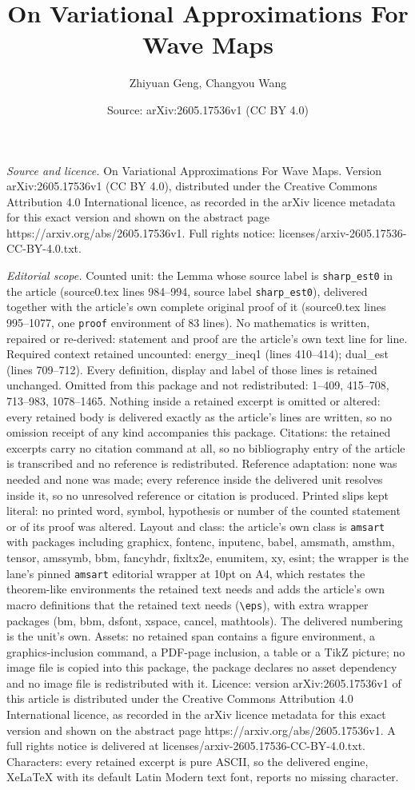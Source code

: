 \documentclass[10pt,a4paper]{amsart}
\title[On Variational Approximations For Wave Maps]{On Variational Approximations For Wave Maps}
\author{Zhiyuan Geng, Changyou Wang}
\date{Source: arXiv:2605.17536v1 (CC BY 4.0)}
\begin{document}
\maketitle

\noindent\emph{Source and licence.} On Variational Approximations For Wave Maps. Version arXiv:2605.17536v1 (CC BY 4.0), distributed under the Creative Commons Attribution 4.0 International licence, as recorded in the arXiv licence metadata for this exact version and shown on the abstract page https://arxiv.org/abs/2605.17536v1. Full rights notice: licenses/arxiv-2605.17536-CC-BY-4.0.txt.\par\smallskip

\noindent\textit{Editorial scope.} Counted unit: the Lemma whose source label is \texttt{sharp\_est0} in the article (source0.tex lines 984--994, source label \texttt{sharp\_est0}), delivered together with the article's own complete original proof of it (source0.tex lines 995--1077, one \texttt{proof} environment of 83 lines). No mathematics is written, repaired or re-derived: statement and proof are the article's own text line for line. Required context retained uncounted: energy\_ineq1 (lines 410--414); dual\_est (lines 709--712). Every definition, display and label of those lines is retained unchanged. Omitted from this package and not redistributed: 1--409, 415--708, 713--983, 1078--1465. Nothing inside a retained excerpt is omitted or altered: every retained body is delivered exactly as the article's lines are written, so no omission receipt of any kind accompanies this package. Citations: the retained excerpts carry no citation command at all, so no bibliography entry of the article is transcribed and no reference is redistributed. Reference adaptation: none was needed and none was made; every reference inside the delivered unit resolves inside it, so no unresolved reference or citation is produced. Printed slips kept literal: no printed word, symbol, hypothesis or number of the counted statement or of its proof was altered. Layout and class: the article's own class is \texttt{amsart} with packages including graphicx, fontenc, inputenc, babel, amsmath, amsthm, tensor, amssymb, bbm, fancyhdr, fixltx2e, enumitem, xy, esint; the wrapper is the lane's pinned \texttt{amsart} editorial wrapper at 10pt on A4, which restates the theorem-like environments the retained text needs and adds the article's own macro definitions that the retained text needs (\texttt{\textbackslash eps}), with extra wrapper packages (bm, bbm, dsfont, xspace, cancel, mathtools). The delivered numbering is the unit's own. Assets: no retained span contains a figure environment, a graphics-inclusion command, a PDF-page inclusion, a table or a TikZ picture; no image file is copied into this package, the package declares no asset dependency and no image file is redistributed with it. Licence: version arXiv:2605.17536v1 of this article is distributed under the Creative Commons Attribution 4.0 International licence, as recorded in the arXiv licence metadata for this exact version and shown on the abstract page https://arxiv.org/abs/2605.17536v1. A full rights notice is delivered at licenses/arxiv-2605.17536-CC-BY-4.0.txt. Characters: every retained excerpt is pure ASCII, so the delivered engine, XeLaTeX with its default Latin Modern text font, reports no missing character.
\end{document}
